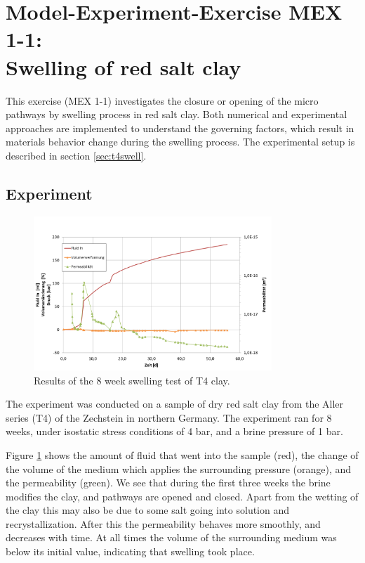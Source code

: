 \section[MEX 1-1: Swelling of red salt clay]{Model-Experiment-Exercise MEX 1-1:\\Swelling of red salt clay}
\label{sec:mex05}
This exercise (MEX 1-1) investigates the closure or opening of the micro pathways by swelling process in red salt clay. Both numerical and experimental approaches are implemented to understand the governing factors, which result in materials behavior change during the swelling process. The experimental setup is described in section \ref{sec:t4swell}.

\subsection{Experiment}

\begin{figure}[ht]
\centering
\includegraphics[width=0.8\textwidth]{figures/IfG-T4-results.png}
\caption{Results of the 8 week swelling test of T4 clay.}
\label{fig:t4swellresults}
\end{figure}

The experiment was conducted on a sample of dry red salt clay from the Aller series (T4) of the Zechstein in northern Germany. The experiment ran for 8 weeks, under isostatic stress conditions of 4 bar, and a brine pressure of 1 bar. 

Figure \ref{fig:t4swellresults} shows the amount of fluid that went into the sample (red), the change of the volume of the medium which applies the surrounding pressure (orange), and the permeability (green). We see that during the first three weeks the brine modifies the clay, and pathways are opened and closed. Apart from the wetting of the clay this may also be due to some salt going into solution and recrystallization. After this the permeability behaves more smoothly, and decreases with time. At all times the volume of the surrounding medium was below its initial value, indicating that swelling took place. 

